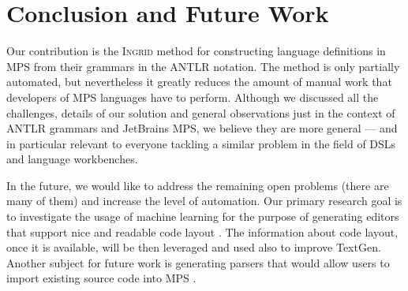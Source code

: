 \section{Conclusion and Future Work}

Our contribution is the \textsc{Ingrid} method for constructing language definitions in MPS from their grammars in the ANTLR notation.
The method is only partially automated, but nevertheless it greatly reduces the amount of manual work  that developers of MPS languages have to perform.
Although we discussed all the challenges, details of our solution and general observations just in the context of ANTLR grammars and JetBrains MPS, we believe they are more general  --- and in particular relevant to everyone tackling a similar problem in the field of DSLs and language workbenches.

In the future, we would like to address the remaining open problems (there are many of them)  and increase the level of automation.
Our primary research goal is to investigate the usage of machine learning for the purpose of generating editors that support nice and readable code layout .
The information about code layout, once it is available, will be then leveraged and used also to improve TextGen.
Another subject for future work is generating parsers that would allow users to import existing source code into MPS .

